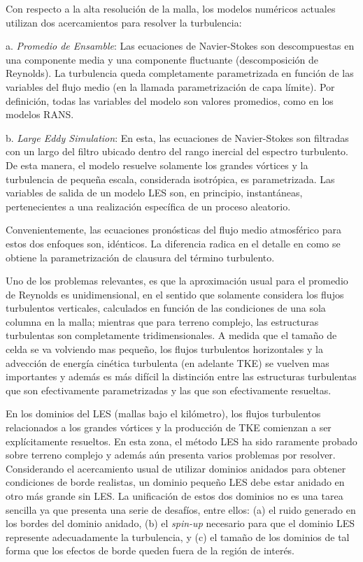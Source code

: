 Con respecto a la alta resolución de la malla, los modelos numéricos actuales utilizan dos acercamientos para resolver la turbulencia:
\begin{enumerate*}
	\item[a.] \emph{Promedio de Ensamble}: Las ecuaciones de Navier-Stokes son descompuestas en una componente media y una componente fluctuante (descomposición de Reynolds). La turbulencia queda completamente parametrizada en función de las variables del flujo medio (en la llamada parametrización de capa límite). Por definición, todas las variables del modelo son valores promedios, como en los modelos RANS.
	\item[b.] \emph{Large Eddy Simulation}: En esta, las ecuaciones de Navier-Stokes son filtradas con un largo del filtro ubicado dentro del rango inercial del espectro turbulento. De esta manera, el modelo resuelve solamente los grandes vórtices y la turbulencia de pequeña escala, considerada isotrópica, es parametrizada. Las variables de salida de un modelo LES son, en principio, instantáneas, pertenecientes a una realización específica de un proceso aleatorio.
\end{enumerate*} 

Convenientemente, las ecuaciones pronósticas del flujo medio atmosférico para estos dos enfoques son, idénticos. La diferencia radica en el detalle en como se obtiene la parametrización de clausura del término turbulento.

Uno de los problemas relevantes, es que la aproximación usual para el promedio de Reynolds es unidimensional, en el sentido que solamente considera los flujos turbulentos verticales, calculados en función de las condiciones de una sola columna en la malla; mientras que para terreno complejo, las estructuras turbulentas son completamente tridimensionales. A medida que el tamaño de celda se va volviendo mas pequeño, los flujos turbulentos horizontales y la advección de energía cinética turbulenta (en adelante TKE) se vuelven mas importantes y además es más difícil la distinción entre las estructuras turbulentas que son efectivamente parametrizadas y las que son efectivamente resueltas. 

En los dominios del LES (mallas bajo el kilómetro), los flujos turbulentos relacionados a los grandes vórtices y la producción de TKE comienzan a ser explícitamente resueltos. En esta zona, el método LES ha sido raramente probado sobre terreno complejo y además aún presenta varios problemas por resolver. Considerando el acercamiento usual de utilizar dominios anidados para obtener condiciones de borde realistas, un dominio pequeño LES debe estar anidado en otro más grande sin LES. La unificación de estos dos dominios no es una tarea sencilla ya que presenta una serie de desafíos, entre ellos: (a) el ruido generado en los bordes del dominio anidado, (b) el \emph{spin-up} necesario para que el dominio LES represente adecuadamente la turbulencia, y (c) el tamaño de los dominios de tal forma que los efectos de borde queden fuera de la región de interés.

